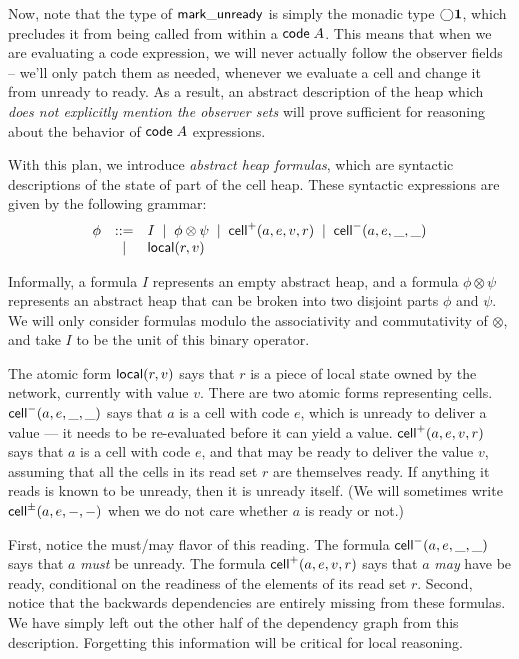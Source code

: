 Now, note that the type of $\mathsf{mark\_unready}$ is simply the monadic
type $\bigcirc{\mathbf{1}}$, which precludes it from being called from within
a $\mathsf{code}\;{A}$. This means that when we are evaluating a code
expression, we will never actually follow the observer fields --
we'll only patch them as needed, whenever we evaluate a
cell and change it from unready to ready.  As a result, an abstract
description of the heap which \emph{does not explicitly mention
the observer sets} will prove sufficient for reasoning about
the behavior of $\mathsf{code}\;{A}$ expressions.

With this plan, we introduce \emph{abstract heap formulas}, which are
syntactic descriptions of the state of part of the cell heap. These
syntactic expressions are given by the following grammar:
\begin{displaymath}
  \begin{array}{lcl}
    \phi & ::= & I \;\;|\;\; \phi \otimes \psi \;\;|\;\; \mathsf{cell}^{+}({a}, {e}, {v}, {r}) \;\;|\;\; \mathsf{cell}^{-}({a}, {e}, {\_}, {\_})\\
         &  |  & \mathsf{local}({r}, {v}) 
  \end{array}
\end{displaymath}

Informally, a formula $I$ represents an empty abstract heap, and a
formula $\phi \otimes \psi$ represents an abstract heap that can be
broken into two disjoint parts $\phi$ and $\psi$. We will only
consider formulas modulo the associativity and commutativity of
$\otimes$, and take $I$ to be the unit of this binary operator.

The atomic form $\mathsf{local}({r}, {v})$ says that $r$ is a piece of local
state owned by the network, currently with value $v$. There are two
atomic forms representing cells. $\mathsf{cell}^{-}({a}, {e}, {\_}, {\_})$ says that $a$ is a
cell with code $e$, which is unready to deliver a value --- it needs
to be re-evaluated before it can yield a value. $\mathsf{cell}^{+}({a}, {e}, {v}, {r})$
says that $a$ is a cell with code $e$, and that may be ready to deliver
the value $v$, assuming that all the cells in its read set $r$ are themselves
ready. If anything it reads is known to be unready, then it is unready
itself. (We will sometimes write $\mathsf{cell}^{\pm}({a}, {e}, {-}, {-})$ when we do not care
whether $a$ is ready or not.)

First, notice the must/may flavor of this reading. The formula
$\mathsf{cell}^{-}({a}, {e}, {\_}, {\_})$ says that $a$ \emph{must} be unready.  The formula
$\mathsf{cell}^{+}({a}, {e}, {v}, {r})$ says that $a$ \emph{may} have be ready,
conditional on the readiness of the elements of its read set
$r$. Second, notice that the backwards dependencies are entirely
missing from these formulas. We have simply left out the other half of
the dependency graph from this description. Forgetting this
information will be critical for local reasoning.

